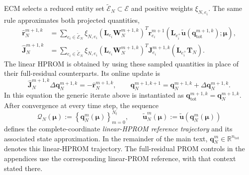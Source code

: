 \documentclass[11pt]{article}
\newcommand{\q}{\mathbf q}
\newcommand{\qtot}{\mathbf q_{\mathrm{tot}}}
\newcommand{\utilde}{\widetilde{\mathbf u}}
\newcommand{\mub}{\bm\mu}
\begin{document}
ECM selects a reduced entity set $\widetilde{\mathcal E}_N\subset\mathcal E$
and positive weights $\xi_{N,e_i}$.  The same rule approximates both
projected quantities,
\begin{equation}
\begin{aligned}
\widehat{\mathbf r}_N^{m+1,k}
&=\sum_{e_i\in\widetilde{\mathcal E}_N}\xi_{N,e_i}
\left(\mathbf L_{e_i}\mathbf W_N^{m+1,k}\right)^T
\mathbf r_{e_i}^{m+1}\!\left(
\mathbf L_{e_i^+}\utilde(\qtot^{m+1,k});\mub\right),\\
\widehat{\mathbf J}_N^{m+1,k}
&=\sum_{e_i\in\widetilde{\mathcal E}_N}\xi_{N,e_i}
\left(\mathbf L_{e_i}\mathbf W_N^{m+1,k}\right)^T
\mathbf J_{e_i}^{m+1,k}\left(\mathbf L_{e_i^+}\mathbf T_N\right).
\end{aligned}
\label{eq:linear-ecm-sampled-normal-equations}
\end{equation}
The linear HPROM is obtained by using these sampled quantities in place of
their full-residual counterparts.  Its online update is
\begin{equation}
\widehat{\mathbf J}_N^{m+1,k}\Delta\q_N^{m+1,k}
=-\widehat{\mathbf r}_N^{m+1,k},\qquad
\q_N^{m+1,k+1}=\q_N^{m+1,k}+\Delta\q_N^{m+1,k}.
\label{eq:linear-hprom-gn-update}
\end{equation}
In this equation the generic iterate above is instantiated as
$\qtot^{m+1,k}=\q_N^{m+1,k}$.  After convergence at every time step, the
sequence
\begin{equation}
\mathcal Q_N(\mub)
:=\left\{\q_N^m(\mub)\right\}_{m=0}^{N_t},\qquad
\utilde_N^m(\mub):=\utilde\!\left(\q_N^m(\mub)\right)
\label{eq:linear-hprom-reference-trajectory}
\end{equation}
defines the complete-coordinate \emph{linear-HPROM reference trajectory}
and its associated state approximation.  In the remainder of the main
text, $\q_N^m\in\mathbb R^{n_{\mathrm{tot}}}$ denotes this linear-HPROM
trajectory.  The full-residual PROM controls in the appendices use the
corresponding linear-PROM reference, with that context stated there.
\end{document}
